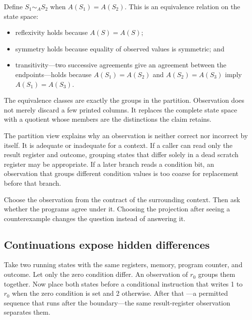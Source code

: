 Define \(S_1\sim_A S_2\) when \(A(S_1)=A(S_2)\). This is an equivalence
relation on the state space:

\begin{itemize}
\item reflexivity holds because \(A(S)=A(S)\);
\item symmetry holds because equality of observed values is symmetric; and
\item transitivity---two successive agreements give an agreement between the
      endpoints---holds because \(A(S_1)=A(S_2)\) and
      \(A(S_2)=A(S_3)\) imply \(A(S_1)=A(S_3)\).
\end{itemize}

The equivalence classes are exactly the groups in the partition. Observation
does not merely discard a few printed columns. It replaces the complete state
space with a quotient whose members are the distinctions the claim retains.

The partition view explains why an observation is neither correct nor
incorrect by
itself. It is adequate or inadequate for a context. If a caller can read only
the result register and outcome, grouping states that differ solely in a dead
scratch register may be appropriate. If a later branch reads a condition bit,
an observation that groups different condition values is too coarse for
replacement before that branch.

\begin{keyidea}[title={Observation fixes what counts as a difference}]
Choose the observation from the contract of the surrounding context. Then ask
whether the programs agree under it. Choosing the projection after seeing a
counterexample changes the question instead of answering it.
\end{keyidea}

\subsection{Continuations expose hidden differences}

Take two running states with the same registers, memory, program counter, and
outcome. Let only the zero condition differ. An observation of \(r_0\) groups
them together. Now place both states before a conditional instruction that
writes 1 to \(r_0\) when the zero condition is set and 2 otherwise. After that
---a permitted sequence that runs after the boundary---the
same result-register observation separates them.

